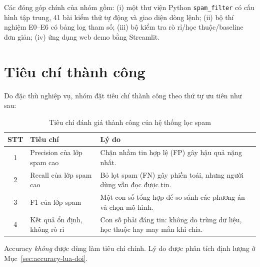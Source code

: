 Các đóng góp chính của nhóm gồm: (i) một thư viện Python \texttt{spam\_filter} có cấu hình tập trung, 41 bài kiểm thử tự động và giao diện dòng lệnh; (ii) bộ thí nghiệm E0--E6 có bảng log tham số; (iii) bộ kiểm tra rò rỉ/học thuộc/baseline đơn giản; (iv) ứng dụng web demo bằng Streamlit.

\section{Tiêu chí thành công}

Do đặc thù nghiệp vụ, nhóm đặt tiêu chí thành công theo thứ tự ưu tiên như sau:

\begin{table}[H]
\centering
\caption{Tiêu chí đánh giá thành công của hệ thống lọc spam}
\label{tab:tieu-chi}
\begin{tabular}{|c|p{3.6cm}|p{9cm}|}
\hline
\textbf{STT} & \textbf{Tiêu chí} & \textbf{Lý do} \\
\hline
1 & Precision của lớp spam cao & Chặn nhầm tin hợp lệ (FP) gây hậu quả nặng nhất. \\
\hline
2 & Recall của lớp spam cao & Bỏ lọt spam (FN) gây phiền toái, nhưng người dùng vẫn đọc được tin. \\
\hline
3 & F1 của lớp spam & Một con số tổng hợp để so sánh các phương án và chọn mô hình. \\
\hline
4 & Kết quả ổn định, không rò rỉ & Con số phải đáng tin: không do trùng dữ liệu, học thuộc hay may mắn khi chia. \\
\hline
\end{tabular}
\end{table}

Accuracy \textit{không} được dùng làm tiêu chí chính. Lý do được phân tích định lượng ở Mục~\ref{sec:accuracy-lua-doi}.
